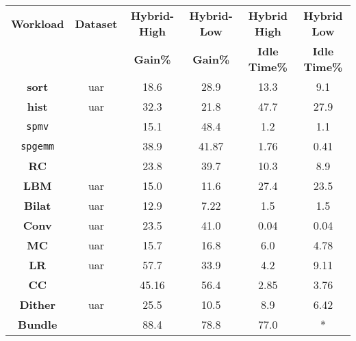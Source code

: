 \documentclass[11pt]{article}
\newcommand{\sgemm} {{\tt spgemm}}
\newcommand{\spmv} {{\tt spmv}}
\newcommand{\bilat} {{\bf Bilat}}
\newcommand{\conv} {{\bf Conv}}
\newcommand{\hist} {{\bf hist}}
\newcommand{\sort} {{\bf sort}}
\newcommand{\LR} {{\bf LR}}
\newcommand{\CC} {{\bf CC}}
\newcommand{\RC} {{\bf RC}}
\newcommand{\MC} {{\bf MC}}
\newcommand{\Bundle} {{\bf Bundle}}
\newcommand{\Dither} {{\bf Dither}}
\newcommand{\LBM} {{\bf LBM}}
\begin{document}
\begin{table*}[htp]
\begin{center}
\begin{tabular}{|c||c|c|c|c|c|}
\hline
{\bf Workload} & {\bf Dataset} & {\bf Hybrid-High} & {\bf
Hybrid-Low } & {\bf Hybrid High } & {\bf Hybrid Low } \\
 & &  {\bf Gain\% } & {\bf Gain\% } & {\bf Idle Time\% } &   {\bf Idle Time\% } \\
\hline
\hline
\sort & uar &  18.6 & 28.9 & 13.3 & 9.1  \\
\hline  
\hist & uar & 32.3 & 21.8 & 47.7 & 27.9 \\
\hline  
\spmv & \cite{vuduc07} & 15.1 & 48.4 & 1.2  & 1.1 \\
\hline  
\sgemm &  \cite{vuduc07} & 38.9 & 41.87 &  1.76 &    0.41\\
\hline  
\RC & \cite{RMBOF07,LGMBP08} &  23.8 & 39.7 &  10.3 &  8.9 \\
\hline  
\LBM & uar & 15.0 &  11.6 &  27.4 &  23.5  \\
\hline  
\bilat & uar &  12.9 & 7.22 & 1.5 & 1.5  \\
\hline  
\conv & uar &  23.5 &  41.0 & 0.04 & 0.04  \\
\hline   
\MC & uar &   15.7& 16.8 &  6.0 & 4.78  \\
\hline  
\LR & uar &  57.7 &  33.9 & 4.2 & 9.11 \\
\hline   
\CC & \cite{rmat} & 45.16 &   56.4 &  2.85 &  3.76  \\
\hline  
\Dither & uar &  25.5 & 10.5 & 8.9 & 6.42 \\
\hline  
\Bundle & \cite{ndurl} &  88.4 &  78.8 & 77.0 & * \\
\hline  
\end{tabular}
\end{center}
\caption{{\sc Summary of results of our implementations on the Hybrid-High and the
Hybrid-Low platforms. The phrase "uar" in the second row refers to the 
dataset that contains
items drawn uniformly at random appropriate for the workload. A citation in
the second row indicates that we have used the datasets from the work
cited. The performance gain indicated is according to the following metric: time
for \sort$\;$ and \hist, GFlops for \spmv, time for \sgemm, Frames per second
for \RC, time for \LBM, M pixles/sec for \bilat$\;$ and \conv, and time for \MC, \LR,
\CC, \Dither, and \Bundle. For the \Bundle$\;$ workload, the idle time on
Hybrid-Low platform is not available.}}
\label{tab:results}
\end{table*}
\end{document}
